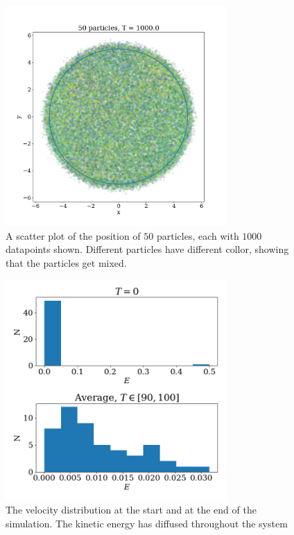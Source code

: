 \documentclass{article}
\begin{document}
        \begin{figure}

            \vspace{-60pt}
            \centering
            \includegraphics[width = 0.75\textwidth]{scatter}
            \vspace{-25pt}
            \caption{A scatter plot of the position of $50$ particles, each with $1000$ datapoints shown. Different particles have different collor, showing that the particles get mixed.}
            \label{scatter}

        \end{figure}
        \begin{figure}

            \vspace{-20pt}
            \centering
            \includegraphics[width = 0.75\textwidth]{all_vel_to_one}
            \caption{The velocity distribution at the start and at the end of the simulation. The kinetic energy has diffused throughout the system}
            \label{kinetic energy}

        \end{figure}
\end{document}

